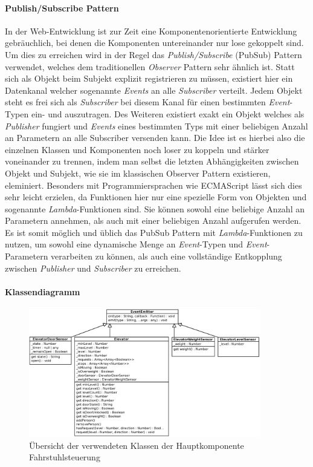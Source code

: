 \paragraph{Publish/Subscribe Pattern}
In der Web-Entwicklung ist zur Zeit eine Komponentenorientierte Entwicklung gebräuchlich, bei denen die Komponenten untereinander nur lose gekoppelt sind.
Um dies zu erreichen wird in der Regel das \textit{Publish/Subscribe} (PubSub) Pattern verwendet, welches dem traditionellen \textit{Observer} Pattern sehr ähnlich ist.
Statt sich als Objekt beim Subjekt explizit registrieren zu müssen, existiert hier ein Datenkanal welcher sogenannte \textit{Events} an alle \textit{Subscriber} verteilt.
Jedem Objekt steht es frei sich als \textit{Subscriber} bei diesem Kanal für einen bestimmten \textit{Event}-Typen ein- und auszutragen.
Des Weiteren existiert exakt ein Objekt welches als \textit{Publisher} fungiert und \textit{Events} eines bestimmten Typs mit einer beliebigen Anzahl an Parametern an alle Subscriber versenden kann.
Die Idee ist es hierbei also die einzelnen Klassen und Komponenten noch loser zu koppeln und stärker voneinander zu trennen, indem man selbst die letzten Abhängigkeiten zwischen Objekt und Subjekt, wie sie im klassischen Observer Pattern existieren, eleminiert.
Besonders mit Programmiersprachen wie ECMAScript lässt sich dies sehr leicht erzielen, da Funktionen hier nur eine spezielle Form von Objekten und sogenannte \textit{Lambda}-Funktionen sind.
Sie können sowohl eine beliebige Anzahl an Parametern annehmen, als auch mit einer beliebigen Anzahl aufgerufen werden.
Es ist somit möglich und üblich das PubSub Pattern mit \textit{Lambda}-Funktionen zu nutzen, um sowohl eine dynamische Menge an \textit{Event}-Typen und \textit{Event}-Parametern verarbeiten zu können, als auch eine vollständige Entkopplung zwischen \textit{Publisher} und \textit{Subscriber} zu erreichen.

\paragraph{Klassendiagramm}
\begin{figure}[h!]
	\centering
	\includegraphics[width=0.9\textwidth]{images/klassendiagramm.eps}
	\caption{Übersicht der verwendeten Klassen der Hauptkomponente Fahrstuhlsteuerung}
	\label{klassdiagramm}
\end{figure}

